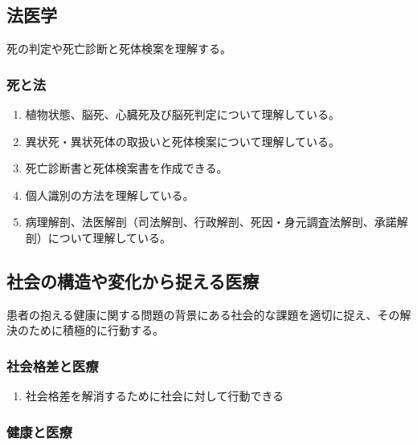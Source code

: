 \documentclass[
]{ltjsarticle}
\providecommand{\tightlist}{%
  \setlength{\itemsep}{0pt}\setlength{\parskip}{0pt}}
\begin{document}
\hypertarget{ux6cd5ux533bux5b66}{%
\subsection{法医学}\label{ux6cd5ux533bux5b66}}

死の判定や死亡診断と死体検案を理解する。

\hypertarget{ux6b7bux3068ux6cd5}{%
\subsubsection{死と法}\label{ux6b7bux3068ux6cd5}}

\begin{enumerate}
\def\labelenumi{\arabic{enumi}.}
\tightlist
\item
  植物状態、脳死、心臓死及び脳死判定について理解している。
\item
  異状死・異状死体の取扱いと死体検案について理解している。
\item
  死亡診断書と死体検案書を作成できる。
\item
  個人識別の方法を理解している。
\item
  病理解剖、法医解剖（司法解剖、行政解剖、死因・身元調査法解剖、承諾解剖）について理解している。
\end{enumerate}

\hypertarget{ux793eux4f1aux306eux69cbux9020ux3084ux5909ux5316ux304bux3089ux6349ux3048ux308bux533bux7642}{%
\subsection{社会の構造や変化から捉える医療}\label{ux793eux4f1aux306eux69cbux9020ux3084ux5909ux5316ux304bux3089ux6349ux3048ux308bux533bux7642}}

患者の抱える健康に関する問題の背景にある社会的な課題を適切に捉え、その解決のために積極的に行動する。

\hypertarget{ux793eux4f1aux683cux5deeux3068ux533bux7642}{%
\subsubsection{社会格差と医療}\label{ux793eux4f1aux683cux5deeux3068ux533bux7642}}

\begin{enumerate}
\def\labelenumi{\arabic{enumi}.}
\tightlist
\item
  社会格差を解消するために社会に対して行動できる
\end{enumerate}

\hypertarget{ux5065ux5eb7ux3068ux533bux7642}{%
\subsubsection{健康と医療}\label{ux5065ux5eb7ux3068ux533bux7642}}
\end{document}
